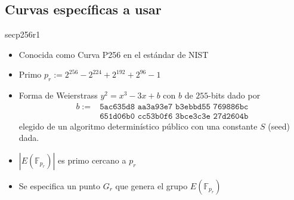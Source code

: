 \documentclass{beamer}
\theoremstyle{remark}
\newtheorem{remark}{Nota}
\begin{document}
\subsection{Curvas específicas a usar}
\begin{frame}{secp256r1}
  \begin{itemize}
    \item Conocida como Curva P256 en el estándar de NIST 
    \item Primo $p_r := 2^{256} - 2^{224} + 2^{192} + 2^{96} - 1$
    \item Forma de Weierstrass $y^2 = x^3 - 3x + b$ con $b$ de $255$-bits dado por
      \begin{equation*}
        \begin{aligned}
          b := &\texttt{5ac635d8 aa3a93e7 b3ebbd55 769886bc}\\
               &\texttt{651d06b0 cc53b0f6 3bce3c3e 27d2604b}
        \end{aligned}
      \end{equation*}
      elegido de un algoritmo determinístico público con una constante $S$ (seed)
      dada.
    \item $|E(\mathbb{F}_{p_r})|$ es primo cercano a $p_r$
    \item Se especifica un punto $G_r$ que genera el grupo $E(\mathbb{F}_{p_r})$
  \end{itemize}
\end{frame}
\end{document}
